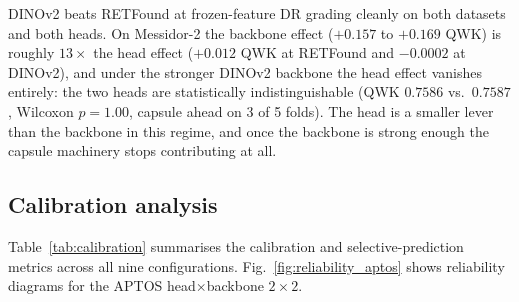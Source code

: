\documentclass[journal]{IEEEtran}
\begin{document}
DINOv2 beats RETFound at frozen-feature DR grading cleanly on both datasets and both heads. On Messidor-2 the backbone effect ($+0.157$ to $+0.169$ QWK) is roughly $13\times$ the head effect ($+0.012$ QWK at RETFound and $-0.0002$ at DINOv2), and under the stronger DINOv2 backbone the head effect vanishes entirely: the two heads are statistically indistinguishable (QWK $0.7586$ vs.\ $0.7587$, Wilcoxon $p = 1.00$, capsule ahead on 3 of 5 folds). The head is a smaller lever than the backbone in this regime, and once the backbone is strong enough the capsule machinery stops contributing at all.

\subsection{Calibration analysis}
\label{sec:calibration}

Table~\ref{tab:calibration} summarises the calibration and selective-prediction metrics across all nine configurations. Fig.~\ref{fig:reliability_aptos} shows reliability diagrams for the APTOS head$\times$backbone $2{\times}2$.
\end{document}
